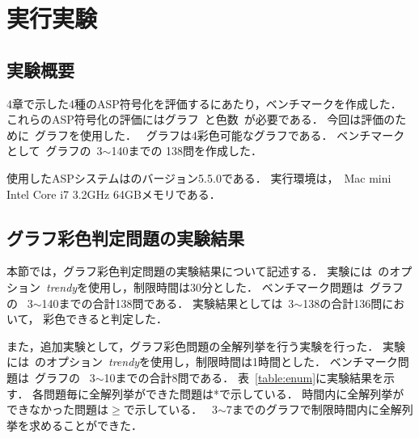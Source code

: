 \chapter{実行実験}

\section{実験概要}

4章で示した4種のASP符号化を評価するにあたり，ベンチマークを作成した．
これらのASP符号化の評価にはグラフ~と色数~が必要である．
今回は評価のために~グラフを使用した．
~グラフは4彩色可能なグラフである．
ベンチマークとして~グラフの~3$\sim$140までの
138問を作成した．

使用したASPシステムは{\clingo}のバージョン5.5.0である．
実行環境は，~Mac mini Intel Core i7 3.2GHz 64GBメモリである．

\section{グラフ彩色判定問題の実験結果}

本節では，グラフ彩色判定問題の実験結果について記述する．
実験には~{\clingo}のオプション~\textit{trendy}を使用し，制限時間は30分とした．
ベンチマーク問題は~グラフの
~3$\sim$140までの合計138問である．
実験結果としては~3$\sim$138の合計136問において，
彩色できると判定した．

また，追加実験として，グラフ彩色問題の全解列挙を行う実験を行った．
実験には~{\clingo}のオプション~\textit{trendy}を使用し，制限時間は1時間とした．
ベンチマーク問題は~グラフの
~3$\sim$10までの合計8問である．
表~\ref{table:enum}に実験結果を示す．
各問題毎に全解列挙ができた問題は*で示している．
時間内に全解列挙ができなかった問題は$\geq$で示している．
~3$\sim$7までのグラフで制限時間内に全解列挙を求めることができた．

\begin{table}[tb]
  \begin{minipage}[t]{0.45\linewidth}
    \centering
  \end{minipage}
  \begin{minipage}[t]{0.45\linewidth}
    \centering
  \end{minipage}
\end{table}

